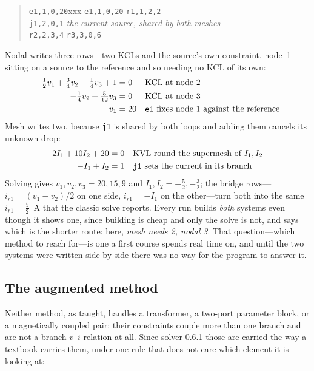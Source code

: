 \documentclass[11pt,oneside]{report}
\newcommand{\code}[1]{\texttt{#1}}
\begin{document}
\begin{quote}
\begin{tabbing}
\code{e1,1,0,20}xxx\=\kill
\code{e1,1,0,20}   \> \code{r1,1,2,2} \\
\code{j1,2,0,1}    \> \emph{the current source, shared by both meshes} \\
\code{r2,2,3,4}    \> \code{r3,3,0,6}
\end{tabbing}
\end{quote}

\noindent Nodal writes three rows---two KCLs and the source's own
constraint, node~1 sitting on a source to the reference and so needing
no KCL of its own:
\begin{align*}
-\tfrac12 v_1 + \tfrac34 v_2 - \tfrac14 v_3 + 1 &= 0 &&
  \text{KCL at node 2} \\
-\tfrac14 v_2 + \tfrac{5}{12} v_3 &= 0 &&
  \text{KCL at node 3} \\
v_1 &= 20 &&
  \text{\code{e1} fixes node 1 against the reference}
\end{align*}
Mesh writes two, because \code{j1} is shared by both loops and adding
them cancels its unknown drop:
\begin{align*}
2 I_1 + 10 I_2 + 20 &= 0 &&
  \text{KVL round the supermesh of } I_1, I_2 \\
-I_1 + I_2 &= 1 &&
  \text{\code{j1} sets the current in its branch}
\end{align*}
Solving gives $v_1, v_2, v_3 = 20, 15, 9$ and $I_1, I_2 =
-\tfrac52, -\tfrac32$; the bridge rows---$i_{r1} = (v_1 - v_2)/2$ on
one side, $i_{r1} = -I_1$ on the other---turn both into the same
$i_{r1} = \tfrac52$~A that the classic solve reports. Every run builds
\emph{both} systems even though it shows one, since building is cheap
and only the solve is not, and says which is the shorter route: here,
\emph{mesh needs 2, nodal 3}. That question---which method to reach
for---is one a first course spends real time on, and until the two
systems were written side by side there was no way for the program to
answer it.

\subsection{The augmented method}
\label{sec:augmented}

Neither method, as taught, handles a transformer, a two-port
parameter block, or a magnetically coupled pair: their constraints
couple more than one branch and are not a branch $v$--$i$ relation at
all. Since solver 0.6.1 those are carried the way a textbook carries
them, under one rule that does not care which element it is looking
at:
\end{document}
